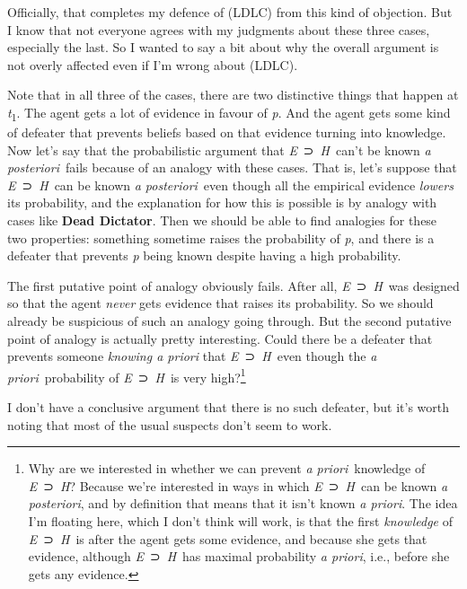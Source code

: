 \documentclass[
  11pt,
  letterpaper,
  DIV=11,
  numbers=noendperiod,
  twoside]{scrartcl}
\begin{document}
Officially, that completes my defence of (LDLC) from this kind of
objection. But I know that not everyone agrees with my judgments about
these three cases, especially the last. So I wanted to say a bit about
why the overall argument is not overly affected even if I'm wrong about
(LDLC).

Note that in all three of the cases, there are two distinctive things
that happen at \emph{t}\textsubscript{1}. The agent gets a lot of
evidence in favour of \emph{p}. And the agent gets some kind of defeater
that prevents beliefs based on that evidence turning into knowledge. Now
let's say that the probabilistic argument that \emph{E}~⊃~\emph{H}~can't
be known \emph{a posteriori}~fails because of an analogy with these
cases. That is, let's suppose that \emph{E}~⊃~\emph{H}~can be known
\emph{a posteriori}~even though all the empirical evidence \emph{lowers}
its probability, and the explanation for how this is possible is by
analogy with cases like \textbf{Dead Dictator}. Then we should be able
to find analogies for these two properties: something sometime raises
the probability of \emph{p}, and there is a defeater that prevents
\emph{p} being known despite having a high probability.

The first putative point of analogy obviously fails. After all,
\emph{E}~⊃~\emph{H}~was designed so that the agent \emph{never} gets
evidence that raises its probability. So we should already be suspicious
of such an analogy going through. But the second putative point of
analogy is actually pretty interesting. Could there be a defeater that
prevents someone \emph{knowing a priori} that \emph{E}~⊃~\emph{H}~even
though the \emph{a priori}~probability of \emph{E}~⊃~\emph{H}~is very
high?\footnote{Why are we interested in whether we can prevent \emph{a
  priori}~knowledge of \emph{E}~⊃~\emph{H}? Because we're interested in
  ways in which \emph{E}~⊃~\emph{H}~can be known \emph{a posteriori},
  and by definition that means that it isn't known \emph{a priori}. The
  idea I'm floating here, which I don't think will work, is that the
  first \emph{knowledge} of \emph{E}~⊃~\emph{H}~is after the agent gets
  some evidence, and because she gets that evidence, although
  \emph{E}~⊃~\emph{H}~has maximal probability \emph{a priori}, i.e.,
  before she gets any evidence.}

I don't have a conclusive argument that there is no such defeater, but
it's worth noting that most of the usual suspects don't seem to work.
\end{document}
